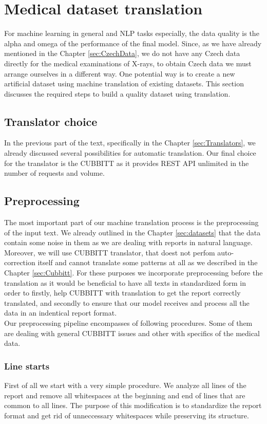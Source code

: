 \section{Medical dataset translation}
\label{sec:medDataTranslation}
For machine learning in general and NLP tasks especially, the data quality is the alpha and omega of the performance of the final model. Since, as we have already mentioned in the Chapter \ref{sec:CzechData}, we do not have any Czech data directly for the medical examinations of X-rays, to obtain Czech data we must arrange ourselves in a different way. One potential way is to create a new artificial dataset using machine translation of existing datasets. This section discusses the required steps to build a quality dataset using translation.

\subsection{Translator choice}
In the previous part of the text, specifically in the Chapter \ref{sec:Translators}, we already discussed several possibilities for automatic translation. Our final choice for the translator is the CUBBITT as it provides REST API unlimited in the number of requests and volume.

\subsection{Preprocessing}
\label{sec:DataPreprocessing}
The most important part of our machine translation process is the preprocessing of the input text. We already outlined in the Chapter \ref{sec:datasets} that the data contain some noise in them as we are dealing with reports in natural language. Moreover, we will use CUBBITT translator, that doest not perfom auto-correction itself and cannot translate some patterns at all as we described in the Chapter \ref{sec:Cubbitt}. For these purposes we incorporate preprocessing before the translation as it would be beneficial to have all texts in standardized form in order to firstly, help CUBBITT with translation to get the report correctly translated, and secondly to ensure that our model receives and process all the data in an indentical report format.\\

Our preprocessing pipeline encompasses of following procedures. Some of them are dealing with general CUBBITT issues and other with specifics of the medical data.

\subsubsection*{Line starts}
First of all we start with a very simple procedure. We analyze all lines of the report and remove all whitespaces at the beginning and end of lines that are common to all lines. The purpose of this modification is to standardize the report format and get rid of unneccessary whitespaces while preserving its structure.

